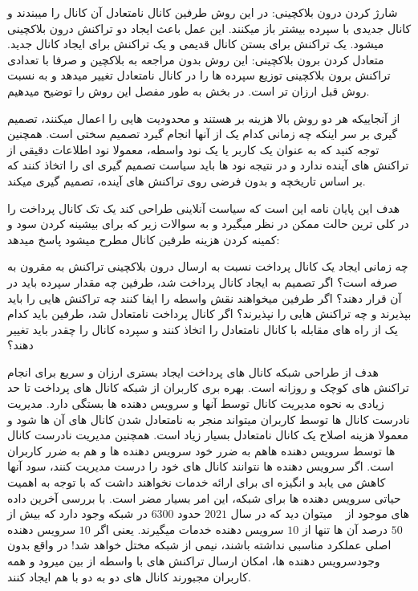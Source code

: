 
 شارژ کردن درون بلاکچینی: در این روش طرفین کانال نامتعادل آن کانال را میبندند و کانال جدیدی با سپرده بیشتر باز میکنند. این عمل باعث ایجاد دو تراکنش درون بلاکچینی میشود. یک تراکنش برای بستن کانال قدیمی و یک تراکنش برای ایجاد کانال جدید.
متعادل کردن برون بلاکچینی: این روش بدون مراجعه به بلاکچین و صرفا با تعدادی تراکنش برون بلاکچینی توزیع سپرده ها را در کانال نامتعادل تغییر میدهد و به نسبت روش قبل ارزان تر است. در بخش  به طور مفصل این روش را توضیح میدهیم. 

 از آنجاییکه هر دو روش بالا هزینه بر هستند و محدودیت هایی را اعمال میکنند، تصمیم گیری بر سر اینکه چه زمانی کدام یک از آنها انجام گیرد تصمیم سختی است. همچنین توجه کنید که به عنوان یک کاربر یا یک نود واسطه، معمولا نود اطلاعات دقیقی از تراکنش های آینده ندارد و در نتیجه نود ها باید سیاست تصمیم گیری ای را اتخاذ کنند که بر اساس تاریخچه و بدون فرضی روی تراکنش های آینده، تصمیم گیری میکند.
 
 
هدف این پایان نامه این است که سیاست آنلاینی طراحی کند یک تک کانال پرداخت را در کلی ترین حالت ممکن در نظر 
میگیرد و به سوالات زیر که برای بیشینه کردن سود و کمینه کردن هزینه طرفین کانال مطرح میشود پاسخ میدهد:


چه زمانی ایجاد یک کانال پرداخت نسبت به ارسال درون بلاکچینی تراکنش به مقرون به صرفه است؟
اگر تصمیم به ایجاد کانال پرداخت شد، طرفین چه مقدار سپرده باید در آن قرار دهند؟
اگر طرفین میخواهند نقش واسطه را ایفا کنند چه تراکنش هایی را باید بپذیرند و چه تراکنش هایی را نپذیرند؟
اگر کانال پرداخت نامتعادل شد، طرفین باید کدام یک از راه های  مقابله با کانال نامتعادل را اتخاذ کنند و سپرده کانال را چقدر باید تغییر دهند؟




هدف از طراحی شبکه کانال های پرداخت ایجاد بستری ارزان و سریع برای انجام تراکنش های کوچک و روزانه  است. بهره بری کاربران از شبکه کانال های پرداخت تا حد زیادی به نحوه مدیریت کانال توسط آنها و سرویس دهنده ها بستگی دارد. مدیریت نادرست کانال ها توسط کاربران میتواند منجر به نامتعادل شدن کانال های آن ها شود و معمولا هزینه اصلاح یک کانال نامتعادل بسیار زیاد است. همچنین مدیریت نادرست کانال ها توسط سرویس دهنده هاهم به ضرر خود سرویس دهنده ها و هم به ضرر کاربران است. اگر سرویس دهنده ها نتوانند کانال های خود را درست مدیریت کنند، سود آنها کاهش می یابد و انگیزه ای برای ارائه خدمات نخواهند داشت که با توجه به اهمیت حیاتی سرویس دهنده ها برای شبکه، این امر بسیار مضر است. با بررسی آخرین داده های موجود از  ~\cite{lngossip} میتوان دید که در سال $2021$ حدود $6300$ در شبکه وجود دارد که بیش از $50$ درصد آن ها تنها از $10$ سرویس دهنده خدمات میگیرند. یعنی اگر $10$ سرویس دهنده اصلی  عملکرد مناسبی نداشته باشند، نیمی از شبکه مختل خواهد شد! در واقع بدون وجودسرویس دهنده ها، امکان ارسال تراکنش های با واسطه از بین میرود و همه کاربران مجبورند کانال های دو به دو با هم ایجاد کنند.

